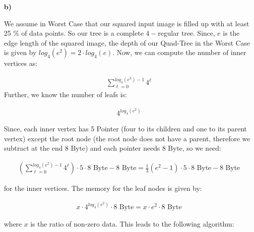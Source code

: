 \documentclass[english, fontsize=12pt, paper=a4, twoside=false, draft=true, pagesize=auto, version=last, DIV=16]{scrartcl}
\theoremstyle{break}
\begin{document}
\textbf{b)} \par
We assume in Worst Case that our squared input image is filled up with at least 25 \% of data points. So our tree is a complete $4-$regular tree. Since, $e$ is the edge length of the squared image, the depth of our Quad-Tree in the Worst Case is given by $log_4(e^2) = 2 \cdot log_4(e)$. Now, we can compute the number of inner vertices as: \par
\vspace*{-3mm}
\begin{equation}
\begin{aligned}
\sum\limits_{\ell = 0}^{log_4(e^2) - 1} 4^\ell
\end{aligned}
\end{equation}
Further, we know the number of leafs is: \par
\vspace*{-3mm}
\begin{equation}
\begin{aligned}
4^{log_4(e^2)}
\end{aligned}
\end{equation} \par
Since, each inner vertex has 5 Pointer (four to its children and one to its parent vertex) except the root node (the root node does not have a parent, therefore we subtract at the end $8 \text{ Byte}$) and each pointer needs 8 Byte, so we need: \par
\vspace*{-3mm}
\begin{equation}
\begin{aligned}
\left( \sum\limits_{\ell = 0}^{log_4(e^2) - 1} 4^\ell \right) \cdot 5 \cdot 8 \text{ Byte} - 8 \text{ Byte}= \frac{1}{3}\left( e^2 - 1 \right) \cdot 5 \cdot 8 \text{ Byte} - 8 \text{ Byte}
\end{aligned}
\end{equation} \par
for the inner vertices. The memory for the leaf nodes is given by: \par
\vspace*{-3mm}
\begin{equation}
\begin{aligned}
x \cdot 4^{log_4(e^2)} \cdot 8 \text{ Byte} = x \cdot e^2 \cdot 8 \text{ Byte}
\end{aligned}
\end{equation} \par
where $x$ is the ratio of non-zero data. This leads to the following algorithm: \par
\end{document}
